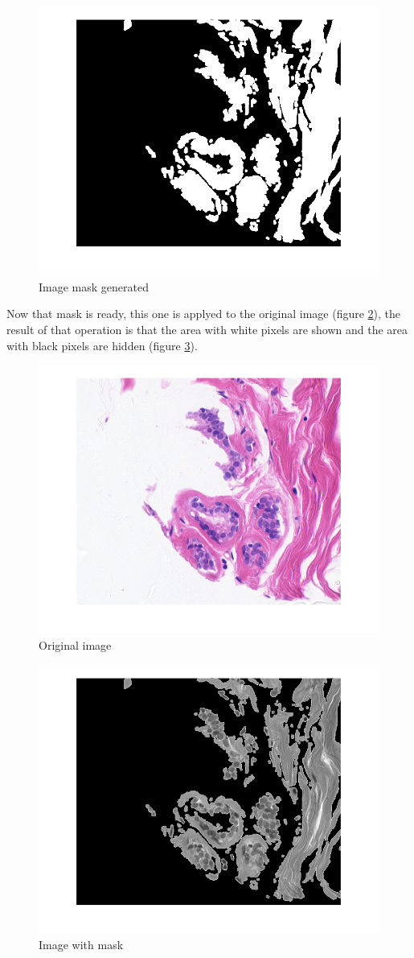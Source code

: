 \documentclass[conference]{IEEEtran}
\begin{document}
	\begin{figure}[h]
		\centering
		\includegraphics[width=0.7\linewidth]{images/fourrierFiltering/mask}
		\caption{Image mask generated}
		\label{fig:mask}
	\end{figure}

	\par Now that mask is ready, this one is applyed to the original image (figure \ref{fig:original}), the result of that operation is that the area with white pixels are shown and the area with black pixels are hidden (figure \ref{fig:maskedimage}).

	\begin{figure}[h]
		\centering
		\includegraphics[width=0.7\linewidth]{images/fourrierFiltering/original}
		\caption{Original image}
		\label{fig:original}
	\end{figure}

	\begin{figure}[h]
		\centering
		\includegraphics[width=0.7\linewidth]{images/fourrierFiltering/maskedImage}
		\caption{Image with mask}
		\label{fig:maskedimage}
	\end{figure}
\end{document}

